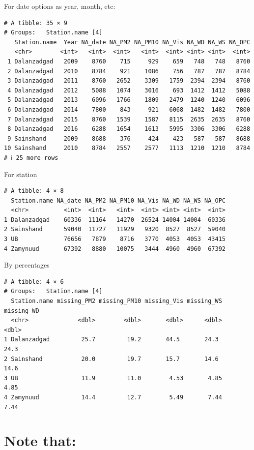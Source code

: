 \documentclass[
]{agujournal2019}
\begin{document}
For date options as year, month, etc:

\begin{verbatim}
# A tibble: 35 × 9
# Groups:   Station.name [4]
   Station.name  Year NA_date NA_PM2 NA_PM10 NA_Vis NA_WD NA_WS NA_OPC
   <chr>        <int>   <int>  <int>   <int>  <int> <int> <int>  <int>
 1 Dalanzadgad   2009    8760    715     929    659   748   748   8760
 2 Dalanzadgad   2010    8784    921    1086    756   787   787   8784
 3 Dalanzadgad   2011    8760   2652    3309   1759  2394  2394   8760
 4 Dalanzadgad   2012    5088   1074    3016    693  1412  1412   5088
 5 Dalanzadgad   2013    6096   1766    1809   2479  1240  1240   6096
 6 Dalanzadgad   2014    7800    843     921   6068  1482  1482   7800
 7 Dalanzadgad   2015    8760   1539    1587   8115  2635  2635   8760
 8 Dalanzadgad   2016    6288   1654    1613   5995  3306  3306   6288
 9 Sainshand     2009    8688    376     424    423   587   587   8688
10 Sainshand     2010    8784   2557    2577   1113  1210  1210   8784
# ℹ 25 more rows
\end{verbatim}

For station

\begin{verbatim}
# A tibble: 4 × 8
  Station.name NA_date NA_PM2 NA_PM10 NA_Vis NA_WD NA_WS NA_OPC
  <chr>          <int>  <int>   <int>  <int> <int> <int>  <int>
1 Dalanzadgad    60336  11164   14270  26524 14004 14004  60336
2 Sainshand      59040  11727   11929   9320  8527  8527  59040
3 UB             76656   7879    8716   3770  4053  4053  43415
4 Zamynuud       67392   8880   10075   3444  4960  4960  67392
\end{verbatim}

By percentages

\begin{verbatim}
# A tibble: 4 × 6
# Groups:   Station.name [4]
  Station.name missing_PM2 missing_PM10 missing_Vis missing_WS missing_WD
  <chr>              <dbl>        <dbl>       <dbl>      <dbl>      <dbl>
1 Dalanzadgad         25.7         19.2       44.5       24.3       24.3 
2 Sainshand           20.0         19.7       15.7       14.6       14.6 
3 UB                  11.9         11.0        4.53       4.85       4.85
4 Zamynuud            14.4         12.7        5.49       7.44       7.44
\end{verbatim}

\section{Note that:}\label{note-that}
\end{document}
